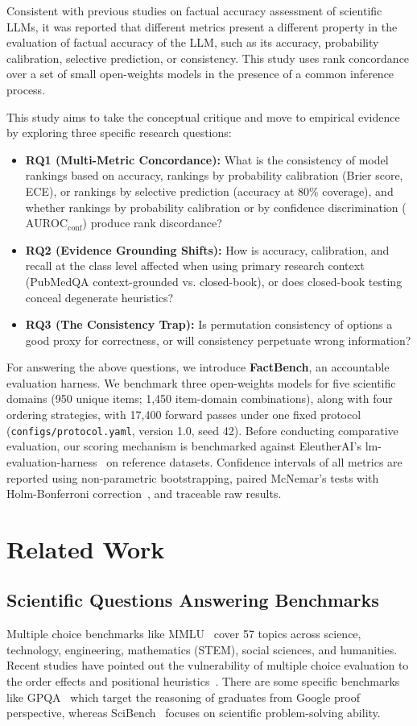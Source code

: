 \documentclass[sigconf,nonacm]{acmart}
\makeatletter
\DeclareRobustCommand{\_}{\ifmmode\nfss@text{\textunderscore}\else\textunderscore\allowbreak\fi}
\newcommand{\protocolfile}{\texttt{configs/\allowbreak protocol.yaml}}
\makeatother
\begin{document}
Consistent with previous studies on factual accuracy assessment of scientific LLMs, it was reported that different metrics present a different property in the evaluation of factual accuracy of the LLM, such as its accuracy, probability calibration, selective prediction, or consistency. This study uses rank concordance over a set of small open-weights models in the presence of a common inference process.

This study aims to take the conceptual critique and move to empirical evidence by exploring three specific research questions:
\begin{itemize}
    \item \textbf{RQ1 (Multi-Metric Concordance):} What is the consistency of model rankings based on accuracy, rankings by probability calibration (Brier score, ECE), or rankings by selective prediction (accuracy at 80\% coverage), and whether rankings by probability calibration or by confidence discrimination ($\text{AUROC}_{\text{conf}}$) produce rank discordance?
    \item \textbf{RQ2 (Evidence Grounding Shifts):} How is accuracy, calibration, and recall at the class level affected when using primary research context (PubMedQA context-grounded vs. closed-book), or does closed-book testing conceal degenerate heuristics?
    \item \textbf{RQ3 (The Consistency Trap):} Is permutation consistency of options a good proxy for correctness, or will consistency perpetuate wrong information?
\end{itemize}

For answering the above questions, we introduce \textbf{FactBench}, an accountable evaluation harness. We benchmark three open-weights models for five scientific domains (950 unique items; 1,450 item-domain combinations), along with four ordering strategies, with 17,400 forward passes under one fixed protocol (\protocolfile, version 1.0, seed 42). Before conducting comparative evaluation, our scoring mechanism is benchmarked against EleutherAI's \textsf{lm-evaluation-harness}~\cite{gao2023framework} on reference datasets. Confidence intervals of all metrics are reported using non-parametric bootstrapping, paired McNemar's tests with Holm-Bonferroni correction~\cite{mcnemar1947,holm1979}, and traceable raw results.

\section{Related Work}
\subsection{Scientific Questions Answering Benchmarks}
Multiple choice benchmarks like MMLU~\cite{hendrycks2021mmlu} cover 57 topics across science, technology, engineering, mathematics (STEM), social sciences, and humanities. Recent studies have pointed out the vulnerability of multiple choice evaluation to the order effects and positional heuristics~\cite{zheng2024large}. There are some specific benchmarks like GPQA~\cite{rein2023gpqa} which target the reasoning of graduates from Google proof perspective, whereas SciBench~\cite{wang2023scibench} focuses on scientific problem-solving ability.
\end{document}
